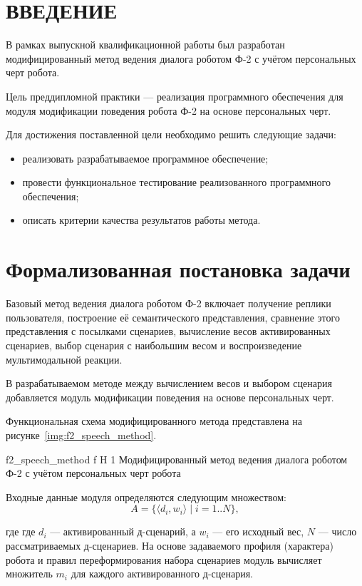\chapter{ВВЕДЕНИЕ}

В рамках выпускной квалификационной работы был разработан модифицированный метод ведения диалога роботом Ф-2 с учётом персональных черт робота.

Цель преддипломной практики --- реализация программного обеспечения для модуля модификации поведения робота Ф-2 на основе персональных черт.

Для достижения поставленной цели необходимо решить следующие задачи:

\begin{itemize}
	\item реализовать разрабатываемое программное обеспечение;
	\item провести функциональное тестирование реализованного программного обеспечения;
	\item описать критерии качества результатов работы метода.
\end{itemize}

\chapter{Формализованная постановка задачи}

Базовый метод ведения диалога роботом Ф-2 включает получение реплики пользователя, построение её семантического представления, сравнение этого представления с посылками сценариев, вычисление весов активированных сценариев, выбор сценария с наибольшим весом и воспроизведение мультимодальной реакции.

В разрабатываемом методе между вычислением весов и выбором сценария добавляется модуль модификации поведения на основе персональных черт.

Функциональная схема модифицированного метода представлена на рисунке~\ref{img:f2_speech_method}.

{f2_speech_method}
{f}
{H}
{1\textwidth}
{Модифицированный метод ведения диалога роботом Ф-2 с учётом персональных черт робота}

Входные данные модуля определяются следующим множеством:
\begin{equation}
	A = \{\langle d_i, w_i \rangle \mid i = 1..N\},
\end{equation}

где где \(d_i\) --- активированный д-сценарий, а \(w_i\) --- его исходный вес, \(N\) --- число рассматриваемых д-сценариев.
На основе задаваемого профиля (характера) робота и правил переформирования набора сценариев модуль вычисляет множитель \(m_i\) для каждого активированного д-сценария.

